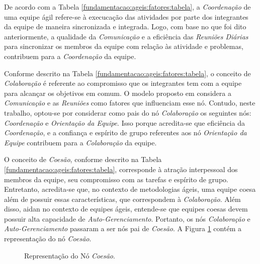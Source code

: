 De acordo com a Tabela \ref{fundamentacao:ageis:fatores:tabela}, a \textit{Coordenação} de uma equipe ágil refere-se à execucação das atividades por parte dos integrantes da equipe de maneira sincronizada e integrada. Logo, com base no que foi dito anteriormente, a qualidade da \textit{Comunicação} e a eficiência das \textit{Reuniões Diárias} para sincronizar os membros da equipe com relação às atividade e problemas, contribuem para a \textit{Coordenação} da equipe.

Conforme descrito na Tabela \ref{fundamentacao:ageis:fatores:tabela}, o conceito de \textit{Colaboração} é referente ao compromisso que os integrantes tem com a equipe para alcançar os objetivos em comum. O modelo proposto em \cite{freire} considera a \textit{Comunicação} e as \textit{Reuniões} como fatores que influenciam esse nó. Contudo, neste trabalho, optou-se por considerar como pais do nó \textit{Colaboração} os seguintes nós: \textit{Coordenação} e \textit{Orientação da Equipe}. Isso porque acredita-se que eficiência da \textit{Coordenação}, e a confiança e espírito de grupo referentes aos nó \textit{Orientação da Equipe} contribuem para a \textit{Colaboração} da equipe.

O conceito de \textit{Coesão}, conforme descrito na Tabela \ref{fundamentacao:ageis:fatores:tabela}, corresponde à atração interpessoal dos membros da equipe, seu compromisso com as tarefas e espírito de grupo. Entretanto, acredita-se que, no contexto de metodologias ágeis, uma equipe coesa além de possuir essas características, que correspondem à \textit{Colaboração}. Além disso, aidan no contexto de equipes ágeis, entende-se que equipes coesas devem possuir alta capacidade de \textit{Auto-Gerenciamento}. Portanto, os nós \textit{Colaboração} e \textit{Auto-Gerenciamento} passaram a ser nós pai de \textit{Coesão}. A Figura \ref{modelo:gad:coesao} contém a representação do nó \textit{Coesão}.

\begin{figure}[ht!]
\begin{center}
	\end{center}
	\caption{Representação do Nó \textit{Coesão}.}
	\label{modelo:gad:coesao}
\end{figure}

